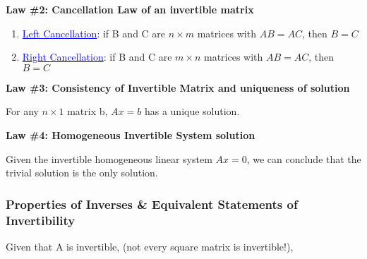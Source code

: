 \documentclass{article}
\newcommand{\bul}[1]{\textcolor{blue}{\underline{#1}}}
\newcommand{\sub}[1]{\vspace{10pt}\textbf{#1}}
\begin{document}
\sub{Law \#2: Cancellation Law of an invertible matrix}
\begin{enumerate}
    \item \bul{Left Cancellation}: if B and C are $n\times m$ matrices with $AB=AC$, then $B=C$
    \item \bul{Right Cancellation}: if B and C are $m\times n$ matrices with $AB=AC$, then $B=C$
\end{enumerate}

\sub{Law \#3: Consistency of Invertible Matrix and uniqueness of solution}

For any $n\times 1$ matrix b, $Ax = b$ has a unique solution.

\sub{Law \#4: Homogeneous Invertible System solution}

Given the invertible homogeneous linear system $Ax=0$, we can conclude that the trivial solution is the only solution.


\subsubsection{Properties of Inverses \& Equivalent Statements of Invertibility}
Given that A is invertible, (not every square matrix is invertible!),
\end{document}
